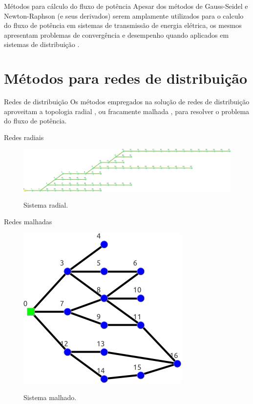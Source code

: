 \documentclass[10pt]{beamer}
\begin{document}
\begin{frame}{Métodos para cálculo do fluxo de potência}
    \justify
    Apesar dos métodos de Gauss-Seidel e Newton-Raphson (e seus derivados) serem amplamente utilizados para o calculo do fluxo de potência em sistemas de transmissão de energia elétrica, os mesmos apresentam problemas de convergência e desempenho quando aplicados em sistemas de distribuição \cite{Eminoglu, Alsaadi, Reddy, Yao}.
\end{frame}

\section{Métodos para redes de distribuição}

\begin{frame}{Redes de distribuição}
    Os métodos empregados na solução de redes de distribuição aproveitam a topologia radial \cite{Cespedes}, ou fracamente malhada \cite{ShirmohammadiMono, Shirmohammadi3F}, para resolver o problema do fluxo de potência.
\end{frame}

\begin{frame}{Redes radiais}
\begin{figure}[H]
   \centering
   \caption{Sistema radial.}
   \includegraphics[scale=0.2]{img/69b}
   \label{fig:69b}
\end{figure}
\end{frame}

\begin{frame}{Redes malhadas}
    \begin{figure}[H]
        \centering
        \caption{Sistema malhado.}
        \includegraphics[scale=0.6]{img/malhado}
        \label{fig:malhado}
    \end{figure}
\end{frame}
\end{document}
